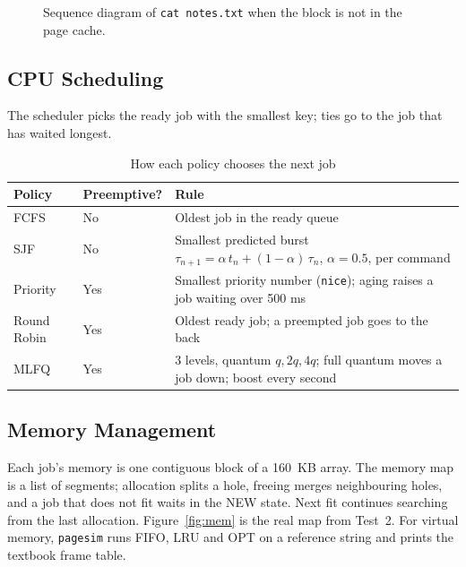 \documentclass[12pt,a4paper]{article}
\begin{document}
\begin{figure}[H]
\centering

\caption{Sequence diagram of \texttt{cat notes.txt} when the block is not in the page cache.}
\end{figure}

\subsection{CPU Scheduling}

The scheduler picks the ready job with the smallest key; ties go to the job that has waited longest.

\begin{table}[H]
\centering
\caption{How each policy chooses the next job}
\small
\begin{tabularx}{\textwidth}{@{}llX@{}}
\toprule
\textbf{Policy} & \textbf{Preemptive?} & \textbf{Rule} \\
\midrule
FCFS & No & Oldest job in the ready queue \\
SJF & No & Smallest predicted burst $\tau_{n+1} = \alpha\, t_n + (1-\alpha)\,\tau_n$, $\alpha = 0.5$, per command \\
Priority & Yes & Smallest priority number (\texttt{nice}); aging raises a job waiting over 500 ms \\
Round Robin & Yes & Oldest ready job; a preempted job goes to the back \\
MLFQ & Yes & 3 levels, quantum $q, 2q, 4q$; full quantum moves a job down; boost every second \\
\bottomrule
\end{tabularx}
\end{table}

\subsection{Memory Management}

Each job's memory is one contiguous block of a 160~KB array. The memory map is a list of segments; allocation splits a hole, freeing merges neighbouring holes, and a job that does not fit waits in the NEW state. Next fit continues searching from the last allocation. Figure~\ref{fig:mem} is the real map from Test~2. For virtual memory, \texttt{pagesim} runs FIFO, LRU and OPT on a reference string and prints the textbook frame table.
\end{document}
